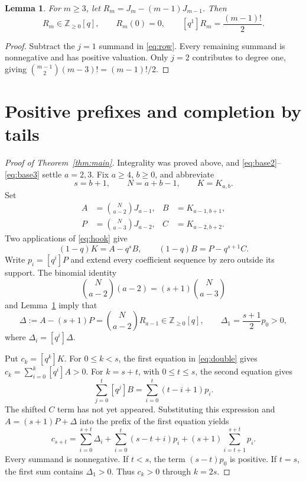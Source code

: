 \documentclass[11pt]{article}
\newtheorem{lemma}[theorem]{Lemma}
\newcommand{\N}{\mathbb Z_{\geq0}}
\newcommand{\coeff}[2]{[q^{#1}]#2}
\begin{document}
\begin{lemma}\label{lem:excess}
For $m\geq3$, let $R_m=J_m-(m-1)J_{m-1}$. Then
\[
 R_m\in\N[q],\qquad R_m(0)=0,\qquad
 \coeff{1}{R_m}=\frac{(m-1)!}{2}.
\]
\end{lemma}
\begin{proof}
Subtract the $j=1$ summand in \eqref{eq:row}. Every remaining summand is
nonnegative and has positive valuation. Only $j=2$ contributes to degree
one, giving $\binom{m-1}{2}(m-3)!=(m-1)!/2$.
\end{proof}

\section{Positive prefixes and completion by tails}

\begin{proof}[Proof of Theorem~\ref{thm:main}]
Integrality was proved above, and \eqref{eq:base2}--\eqref{eq:base3} settle
$a=2,3$. Fix $a\geq4$, $b\geq0$, and abbreviate
\[
 s=b+1,\qquad N=a+b-1,\qquad K=K_{a,b}.
\]
Set
\begin{align*}
 A&=\binom N{a-2}J_{a-1},& B&=K_{a-1,b+1},\\
 P&=\binom N{a-3}J_{a-2},& C&=K_{a-2,b+2}.
\end{align*}
Two applications of \eqref{eq:hook} give
\begin{equation}\label{eq:double}
 (1-q)K=A-q^sB,\qquad (1-q)B=P-q^{s+1}C.
\end{equation}
Write $p_i=\coeff{i}{P}$ and extend every coefficient sequence by zero
outside its support. The binomial identity
\[
 \binom N{a-2}(a-2)=(s+1)\binom N{a-3}
\]
and Lemma~\ref{lem:excess} imply that
\begin{equation}\label{eq:delta}
 \Delta:=A-(s+1)P=\binom N{a-2}R_{a-1}\in\N[q],\qquad
 \Delta_1=\frac{s+1}{2}p_0>0,
\end{equation}
where $\Delta_i=\coeff{i}{\Delta}$.

Put $c_k=\coeff{k}{K}$. For $0\leq k<s$, the first equation in
\eqref{eq:double} gives $c_k=\sum_{i=0}^k\coeff{i}{A}>0$.
For $k=s+t$, with $0\leq t\leq s$, the second equation gives
\[
 \sum_{j=0}^t\coeff{j}{B}=\sum_{i=0}^t(t-i+1)p_i.
\]
The shifted $C$ term has not yet appeared. Substituting this expression
and $A=(s+1)P+\Delta$ into the prefix of the first equation yields
\begin{equation}\label{eq:prefix}
 c_{s+t}=\sum_{i=0}^{s+t}\Delta_i
       +\sum_{i=0}^t(s-t+i)p_i
       +(s+1)\sum_{i=t+1}^{s+t}p_i.
\end{equation}
Every summand is nonnegative. If $t<s$, the term $(s-t)p_0$ is positive.
If $t=s$, the first sum contains $\Delta_1>0$. Thus $c_k>0$ through
$k=2s$.


\end{proof}
\end{document}
